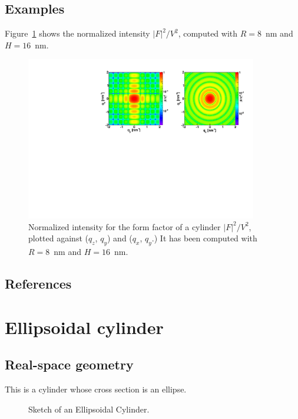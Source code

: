 \subsection{Examples}
Figure~\ref{figFFcylinderEx} shows the normalized intensity
$|F|^2/V^2$, computed with $R=8$~nm and $H=16$~nm.
\begin{figure}[h]
\begin{center}
\includegraphics[width=0.9\textwidth]{Figures/figffcylinder}
\end{center}
\caption{Normalized intensity for the form factor of a cylinder
$|F|^2/V^2$, plotted against ($q_z$, $q_y$) and  ($q_x$, $q_y$.) It
has been  computed with $R=8$~nm and $H=16$~nm.}
\label{figFFcylinderEx}
\end{figure}
\FloatBarrier

\subsection{References}

\newpage{\cleardoublepage}
\section{Ellipsoidal cylinder}  

\subsection{Real-space geometry}
This is a cylinder whose cross section is an ellipse.

\begin{figure}[ht]
\begin{center}
\caption{Sketch of an Ellipsoidal Cylinder.}
\end{center}
\label{ellipscylinder}
\end{figure}

